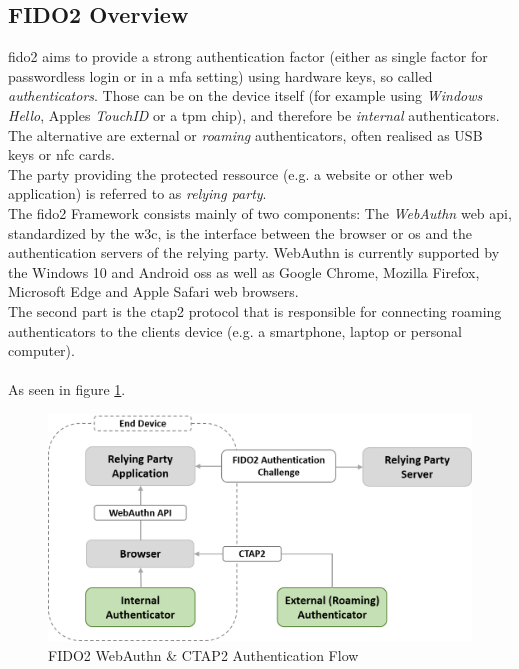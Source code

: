 

\subsection{FIDO2 Overview}
\label{subsec:fido2_webauthn}

\ac{fido2} aims to provide a strong authentication factor (either as single factor for passwordless login or in a \ac{mfa} setting) using hardware keys, so called \emph{authenticators}. Those can be on the device itself (for example using \emph{Windows Hello}, Apples \emph{TouchID} or a \ac{tpm} chip), and therefore be \emph{internal} authenticators. The alternative are external or \emph{roaming} authenticators, often realised as USB keys or \ac{nfc} cards.\\
The party providing the protected ressource (e.g. a website or other web application) is referred to as \emph{relying party}.\\
The \ac{fido2} Framework consists mainly of two components: The \emph{WebAuthn} web \ac{api}, standardized by the \ac{w3c}, is the interface between the browser or \ac{os} and the authentication servers of the relying party\cite{webauthn_standard}. WebAuthn is currently supported by the Windows 10 and Android \acp{os} as well as Google Chrome, Mozilla Firefox, Microsoft Edge and Apple Safari web browsers.\cite{fido2_webauthn}\\
The second part is the \ac{ctap2} protocol that is responsible for connecting roaming authenticators to the clients device (e.g. a smartphone, laptop or personal computer).\cite{fido2_overview,fido2_ctap}\\
\\
As seen in figure \ref{fig:fido2_webauth_ctap_flow}.

\begin{figure}[ht]
    \centering
    \includegraphics[width=1.8\columnwidth]{Figures/fido2_webauth_ctap_flow.png}
    \caption[FIDO2 Authentication Flow]{FIDO2 WebAuthn \& CTAP2 Authentication Flow}
    \label{fig:fido2_webauth_ctap_flow}
\end{figure}